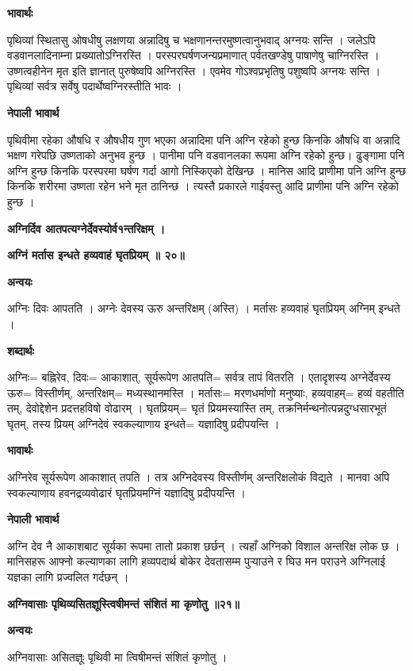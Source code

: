 \documentclass[11pt, a5paper]{article}
\begin{document}
\textbf{भावार्थः}

पृथिव्यां स्थितासु ओषधीषु लक्षणया अन्नादिषु च भक्षणानन्तरमुष्णत्वानुभवाद् अग्नयः सन्ति । जलेऽपि वडवानलादिनाम्ना प्रख्यातोऽग्निरस्ति । परस्परघर्षणजन्यप्रमाणात् पर्वतखण्डेषु पाषाणेषु चाग्निरस्ति । उष्णत्वहीनेन मृत इति ज्ञानात् पुरुषेष्वपि अग्निरस्ति । एवमेव गोऽश्वप्रभृतिषु पशुष्वपि अग्नयः सन्ति । पृथिव्यां सर्वत्र सर्वेषु पदार्थेष्वग्निरस्तीति भावः ।

\textbf{नेपाली भावार्थ}

पृथिवीमा रहेका औषधि र औषधीय गुण भएका अन्नादिमा पनि अग्नि रहेको हुन्छ किनकि औषधि वा अन्नादि भक्षण गरेपछि उष्णताको अनुभव हुन्छ । पानीमा पनि वडवानलका रूपमा अग्नि रहेको हुन्छ। ढुङ्गामा पनि अग्नि हुन्छ किनकि परस्परमा घर्षण गर्दा आगो निस्किएको देखिन्छ । मानिस आदि प्राणीमा पनि अग्नि हुन्छ किनकि शरीरमा उष्णता रहेन भने मृत ठानिन्छ । त्यस्तै प्रकारले गाईवस्तु आदि प्राणीमा पनि अग्नि रहेको हुन्छ ।

\textbf{अग्निर्दिव आतपत्यग्नेर्देवस्योर्व१न्तरिक्षम् ।}

\textbf{अग्निं मर्तास इन्धते हव्यवाहं घृतप्रियम् ॥ २०॥}

\textbf{अन्वयः}

अग्निः दिवः आपतति । अग्नेः देवस्य ऊरु अन्तरिक्षम् (अस्ति) । मर्तासः हव्यवाहं घृतप्रियम् अग्निम् इन्धते ।

\textbf{शब्दार्थः}

अग्निः= बह्निरेव, दिवः= आकाशात्, सूर्यरूपेण आतपति= सर्वत्र तापं वितरति । एतादृशस्य अग्नेर्देवस्य ऊरु= विस्तीर्णम्, अन्तरिक्षम्= मध्यस्थानमस्ति । मर्तासः= मरणधर्माणो मनुष्याः, हव्यवाहम्= हव्यं वहतीति तम्, देवोद्देशेन प्रदत्तहविषो वोढारम् । घृतप्रियम्= घृतं प्रियमस्यास्ति तम्, तक्रनिर्मन्थनोत्पन्नदुग्धसारभूतं घृतम्, तस्य प्रियम् अग्निदेवं स्वकल्याणाय इन्धते= यज्ञादिषु प्रदीपयन्ति ।

\textbf{भावार्थः}

अग्निरेव सूर्यरूपेण आकाशात् तपति । तत्र अग्निदेवस्य विस्तीर्णम् अन्तरिक्षलोकं विद्यते । मानवा अपि स्वकल्याणाय हवनद्रव्यवोढारं घृतप्रियमग्निं यज्ञादिषु प्रदीपयन्ति ।

\textbf{नेपाली भावार्थ}

अग्नि देव नै आकाशबाट सूर्यका रूपमा तातो प्रकाश छर्छन् । त्यहाँ अग्निको विशाल अन्तरिक्ष लोक छ । मानिसहरू आफ्नो कल्याणका लागि हव्यपदार्थ बोकेर देवतासम्म पुर्‍याउने र घिउ मन पराउने अग्निलाई यज्ञका लागि प्रज्वलित गर्दछन् ।

\textbf{अग्निवासाः पृथिव्यसितज्ञूस्त्विषीमन्तं संशितं मा कृणोतु ॥२१॥}

\textbf{अन्वयः}

अग्निवासाः असितज्ञूः पृथिवी मा त्विषीमन्तं संशितं कृणोतु ।
\end{document}
